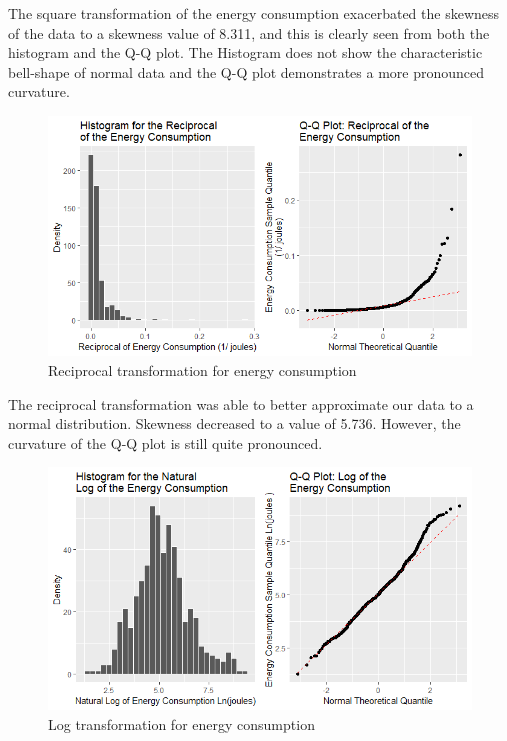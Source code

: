 The square transformation of the energy consumption exacerbated the skewness of the data to a skewness value of 8.311, and this is clearly seen from both the histogram and the Q-Q plot.  The Histogram does not show the characteristic bell-shape of normal data and the Q-Q plot demonstrates a more pronounced curvature.


\begin{figure}[H]
  \includegraphics[width=\linewidth]{./NewImages/Fig_9_Reciprocal_Transform.png}
  \caption{Reciprocal transformation for energy consumption}
  \label{fig:histqq-rec}
\end{figure}

The reciprocal transformation was able to better approximate our data to a normal distribution. Skewness decreased to a value of 5.736. However, the curvature of the Q-Q plot is still quite pronounced.

\begin{figure}[H]
  \includegraphics[width=\linewidth]{./NewImages/Fig_10_Log_Transform.png}
  \caption{Log transformation for energy consumption}
  \label{fig:histqq-log}
\end{figure}


